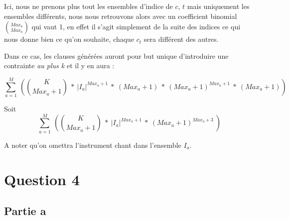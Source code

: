 \documentclass[11pt]{article}
\begin{document}
Ici, nous ne prenons plus tout les ensembles d'indice de $c$, $t$ mais uniquement les ensembles différents, nous nous retrouvons alors avec un coefficient binomial ${Max_a \choose Max_a}$ qui vaut 1, en effet il s'agit simplement de la suite des indices ce qui nous donne bien ce qu'on souhaite, chaque $c_t$ sera différent des autres.

\label{addendum}

Dans ce cas, les clauses générées auront pour but unique d'introduire une contrainte \textsl{au plus k} et il y en aura :

$$\sum_{a=1}^{M}\ \left( {K \choose Max_a+1}\ * \ |I_a|^{Max_a+1}\ *\ \left(Max_a+1\right)\ *\ \left(Max_a+1\right)^{Max_a+1}\ *\  \left(Max_a+1\right) \right) $$

Soit\\

$$\sum_{a=1}^{M}\ \left( {K \choose Max_a+1}\ * \ |I_a|^{Max_a+1}\ *\ \left(Max_a+1\right)^{Max_a+3}\ \right) $$

A noter qu'on omettra l'instrument chant dans l'ensemble $I_a$.

\section{Question 4}

\subsection {Partie a}
\end{document}
